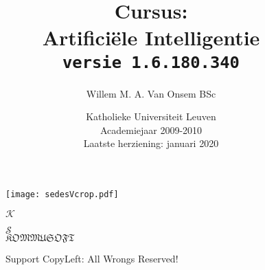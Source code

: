 \documentclass[titlepage,a4paper,twoside]{article}
\title{Cursus:\\Artificiële Intelligentie\\\texttt{\small versie 1.6.180.340}}
\author{Willem M. A. Van Onsem BSc}
\date{Katholieke Universiteit Leuven\\Academiejaar 2009-2010\\
\vspace{4em}Laatste herziening: januari 2020}
\begin{document}
\begin{titlepage}
\begin{figure*}[t]
\centering
\texttt{[image: sedesVcrop.pdf]}
\end{figure*}
\begin{figure*}[b]
\centering
\begin{tiny}
$\mathcal{K}$
\end{tiny}
\begin{Huge}
\textcopyleft
\end{Huge}
\begin{tiny}
$\mathcal{S}$\\
$\mathfrak{KOMMUSOFT}$
\end{tiny}
\caption{Support CopyLeft: All Wrongs Reserved!}
\end{figure*}
\maketitle
\end{titlepage}
\cleardoublepage
{}
\tableofcontents
\newpage
\end{document}
